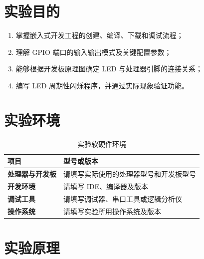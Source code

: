 \documentclass[UTF8,zihao=-4,a4paper,oneside,fontset=fandol]{ctexart}
\begin{document}
\setcounter{page}{1}
\pagestyle{fancy}


\section{实验目的}
\begin{enumerate}
  \item 掌握嵌入式开发工程的创建、编译、下载和调试流程；
  \item 理解 GPIO 端口的输入输出模式及关键配置参数；
  \item 能够根据开发板原理图确定 LED 与处理器引脚的连接关系；
  \item 编写 LED 周期性闪烁程序，并通过实际现象验证功能。
\end{enumerate}

\section{实验环境}
\begin{table}[H]
  \centering
  \caption{实验软硬件环境}
  \label{tab:environment}
  \begin{tabularx}{0.9\textwidth}{>{\bfseries}l X}
    \toprule
    项目 & 型号或版本 \\
    \midrule
    处理器与开发板 & 请填写实际使用的处理器型号和开发板型号 \\
    开发环境 & 请填写 IDE、编译器及版本 \\
    调试工具 & 请填写调试器、串口工具或逻辑分析仪 \\
    操作系统 & 请填写实验所用操作系统及版本 \\
    \bottomrule
  \end{tabularx}
\end{table}

\section{实验原理}
\end{document}
